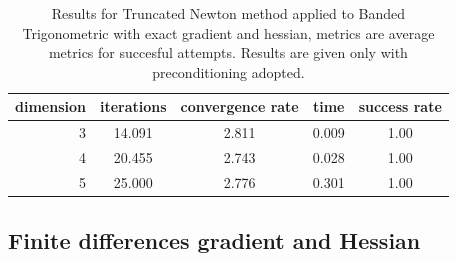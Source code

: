 \begin{table}
\centering
\caption{Results for Truncated Newton method applied to Banded Trigonometric with exact gradient and hessian, metrics are average metrics for succesful attempts. Results are given only with preconditioning adopted.}
\label{tab:Truncated_Newton_Banded_Trigonometric_exact}
\begin{tabular}{r|cc|cc}
\toprule
dimension & iterations & convergence rate & time & success rate \\
\midrule
3 & 14.091 & 2.811 & 0.009 & 1.00 \\
4 & 20.455 & 2.743 & 0.028 & 1.00 \\
5 & 25.000 & 2.776 & 0.301 & 1.00 \\
\bottomrule
\end{tabular}
\end{table}

\subsection{Finite differences gradient and Hessian}

